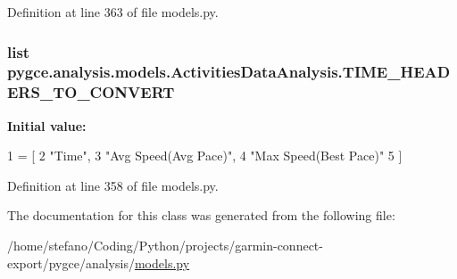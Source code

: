 Definition at line 363 of file models.\+py.

\subsubsection[{\texorpdfstring{T\+I\+M\+E\+\_\+\+H\+E\+A\+D\+E\+R\+S\+\_\+\+T\+O\+\_\+\+C\+O\+N\+V\+E\+RT}{TIME_HEADERS_TO_CONVERT}}]{\setlength{\rightskip}{0pt plus 5cm}list pygce.\+analysis.\+models.\+Activities\+Data\+Analysis.\+T\+I\+M\+E\+\_\+\+H\+E\+A\+D\+E\+R\+S\+\_\+\+T\+O\+\_\+\+C\+O\+N\+V\+E\+RT\hspace{0.3cm}{\ttfamily [static]}}\hypertarget{classpygce_1_1analysis_1_1models_1_1_activities_data_analysis_a2f0ccc7899b8c6b6d94391c80f5def1d}{}\label{classpygce_1_1analysis_1_1models_1_1_activities_data_analysis_a2f0ccc7899b8c6b6d94391c80f5def1d}
{\bfseries Initial value\+:}
\begin{DoxyCode}
1 = [
2         \textcolor{stringliteral}{"Time"},
3         \textcolor{stringliteral}{"Avg Speed(Avg Pace)"},
4         \textcolor{stringliteral}{"Max Speed(Best Pace)"}
5     ]
\end{DoxyCode}


Definition at line 358 of file models.\+py.



The documentation for this class was generated from the following file\+:\begin{DoxyCompactItemize}
\item 
/home/stefano/\+Coding/\+Python/projects/garmin-\/connect-\/export/pygce/analysis/\hyperlink{models_8py}{models.\+py}\end{DoxyCompactItemize}
